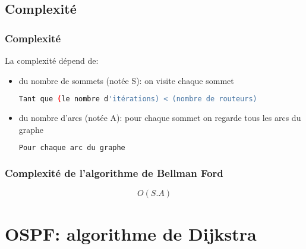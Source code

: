\documentclass[svgnames,11pt]{beamer}
\begin{document}
\subsection{Complexité}
\begin{frame}[fragile]
    \frametitle{Complexité}
La complexité dépend de:
    \begin{itemize}
        \item<1-> du nombre de sommets (notée S): on visite chaque sommet
        \begin{lstlisting}[language=bash,basicstyle=\small,xleftmargin=0em, xrightmargin=0em]
Tant que (le nombre d'itérations) < (nombre de routeurs)
\end{lstlisting}
        \item<2-> du nombre d'arcs (notée A): pour chaque sommet on regarde tous les arcs du graphe
        \begin{lstlisting}[language=bash,basicstyle=\small,xleftmargin=0em, xrightmargin=0em]
Pour chaque arc du graphe
\end{lstlisting}
    \end{itemize}

\end{frame}
\begin{frame}
    \frametitle{Complexité de l'algorithme de Bellman Ford}

    {\LARGE$$O(S.A)$$}
\end{frame}

\section{OSPF: algorithme de Dijkstra}
\end{document}
